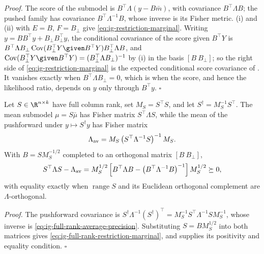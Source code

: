 \noindent\emph{Proof.}
The score of the submodel is \(B^\top\Lambda(y-B\bar m)\), with covariance
\(B^\top\Lambda B\); the pushed family has covariance \(B^\top\Lambda^{-1}B\),
whose inverse is its Fisher metric. (i) and (ii) with
\(E=B\), \(F=B_\perp\) give \eqref{eq:ig-restriction-marginal}. Writing
\(y=BB^\top y+B_\perp B_\perp^\top y\), the conditional covariance of the score
given \(B^\top Y\) is
\(B^\top\Lambda B_\perp\operatorname{Cov}(B_\perp^\top Y\given B^\top Y)B_\perp^\top\Lambda B\),
and \(\operatorname{Cov}(B_\perp^\top Y\given B^\top Y)=(B_\perp^\top\Lambda B_\perp)^{-1}\)
by (i) in the basis \([B\ B_\perp]\); so
the right side of \eqref{eq:ig-restriction-marginal} is the expected
conditional score covariance of . It vanishes
exactly when \(B^\top\Lambda B_\perp=0\), which is when the score, and hence the
likelihood ratio, depends on \(y\) only through \(B^\top y\). \(\square\)

Let \(S\in\R^{n\times k}\) have full column rank, set \(M_S=S^\top S\), and
let \(S^\dagger=M_S^{-1}S^\top\). The mean submodel \(\mu=S\bar\mu\) has Fisher
matrix \(S^\top\Lambda S\), while the mean of the pushforward under
\(y\mapsto S^\dagger y\) has Fisher matrix
\begin{equation}
\Lambda_{\rm av}
=M_S\left(S^\top\Lambda^{-1}S\right)^{-1}M_S.
\label{eq:ig-full-rank-average-precision}
\end{equation}
With \(B=SM_S^{-1/2}\) completed to an orthogonal matrix \([B\ B_\perp]\),
\begin{equation}
S^\top\Lambda S-\Lambda_{\rm av}
=M_S^{1/2}\left[
B^\top\Lambda B-\left(B^\top\Lambda^{-1}B\right)^{-1}
\right]M_S^{1/2}\succeq0,
\label{eq:ig-full-rank-restriction-marginal}
\end{equation}
with equality exactly when \(\operatorname{range}S\) and its Euclidean
orthogonal complement are \(\Lambda\)-orthogonal. 

\noindent\emph{Proof.}
The pushforward covariance is
\(S^\dagger\Lambda^{-1}(S^\dagger)^\top=M_S^{-1}S^\top\Lambda^{-1}SM_S^{-1}\),
whose inverse is \eqref{eq:ig-full-rank-average-precision}. Substituting
\(S=BM_S^{1/2}\) into both matrices gives
\eqref{eq:ig-full-rank-restriction-marginal}, and
 supplies its positivity and equality
condition. \(\square\)

